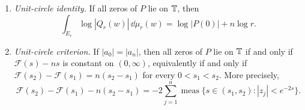 \begin{theorem}
\begin{enumerate}[label=\textup{(\alph*)}]
\[
\mathcal F'_+(s_0)-\mathcal F'_-(s_0)
=2\#\{j:\ |z_j|=e^{-2s_0}\},
\]
with roots counted with multiplicity.  Equivalently, as distributions on
\((0,\infty)\),
\[
D_s^2\mathcal F
=2\sum_{\{j:\ |z_j|<1\}}\delta_{-\frac12\log|z_j|}.
\]
\item \emph{Unit-circle identity.}  If all zeros of \(P\) lie on \(\mathbb{T}\), then
\[
\int_{E_r}\log|Q_r(w)|\,\dd\mu_r(w)=\log|P(0)|+n\log r.
\]
\item \emph{Unit-circle criterion.}  If \(|a_0|=|a_n|\), then all zeros of \(P\) lie on \(\mathbb{T}\) if and only if \(\mathcal F(s)-ns\) is constant on \((0,\infty)\), equivalently if and only if \(\mathcal F(s_2)-\mathcal F(s_1)=n(s_2-s_1)\) for every \(0<s_1<s_2\).  More precisely,
\[
\mathcal F(s_2)-\mathcal F(s_1)-n(s_2-s_1)
=-2\sum_{j=1}^{n}\operatorname{meas}\{s\in(s_1,s_2): |z_j|<e^{-2s}\}.
\]
\end{enumerate}
\end{theorem}
